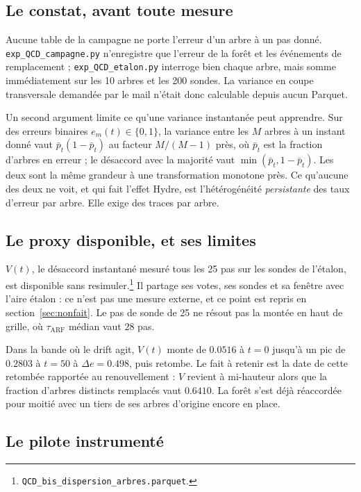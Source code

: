 \documentclass[11pt,a4paper]{article}
\begin{document}
\subsection{Le constat, avant toute mesure}

Aucune table de la campagne ne porte l'erreur d'un arbre à un pas donné.
\texttt{exp\_QCD\_campagne.py} n'enregistre que l'erreur de la forêt et les événements de
remplacement ; \texttt{exp\_QCD\_etalon.py} interroge bien chaque arbre, mais somme
immédiatement sur les 10 arbres et les 200 sondes. La variance en coupe transversale demandée
par le mail n'était donc calculable depuis aucun Parquet.

Un second argument limite ce qu'une variance instantanée peut apprendre. Sur des erreurs
binaires $e_m(t) \in \{0,1\}$, la variance entre les $M$ arbres à un instant donné vaut
$\bar{p}_t(1-\bar{p}_t)$ au facteur $M/(M-1)$ près, où $\bar{p}_t$ est la fraction d'arbres
en erreur ; le désaccord avec la majorité vaut $\min(\bar{p}_t, 1-\bar{p}_t)$. Les deux sont
la même grandeur à une transformation monotone près. Ce qu'aucune des deux ne voit, et qui
fait l'effet Hydre, est l'hétérogénéité \emph{persistante} des taux d'erreur par arbre. Elle
exige des traces par arbre.

\subsection{Le proxy disponible, et ses limites}

$V(t)$, le désaccord instantané mesuré tous les 25 pas sur les sondes de l'étalon, est
disponible sans resimuler.\footnote{\texttt{QCD\_bis\_dispersion\_arbres.parquet}.} Il partage
ses votes, ses sondes et sa fenêtre avec l'aire étalon : ce n'est pas une mesure externe, et
ce point est repris en section~\ref{sec:nonfait}. Le pas de sonde de 25 ne résout pas la
montée en haut de grille, où $\tau_{\mathrm{ARF}}$ médian vaut $28$ pas.

Dans la bande où le drift agit, $V(t)$ monte de $0.0516$ à $t = 0$ jusqu'à un pic de $0.2803$
à $t = 50$ à $\Delta e = 0.498$, puis retombe. Le fait à retenir est la date de cette
retombée rapportée au renouvellement : $V$ revient à mi-hauteur alors que la fraction
d'arbres distincts remplacés vaut $0.6410$. La forêt s'est déjà réaccordée pour moitié avec
un tiers de ses arbres d'origine encore en place.

\subsection{Le pilote instrumenté}
\end{document}
